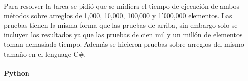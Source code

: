 \documentclass[11pt]{article}
\begin{document}
    \begin{center}
    \end{center}
    { \hspace*{\fill} \\}
    
    Para resolver la tarea se pidió que se midiera el tiempo de ejecución de
ambos métodos sobre arreglos de 1,000, 10,000, 100,000 y 1'000,000
elementos. Las pruebas tienen la misma forma que las pruebas de arriba,
sin embargo solo se incluyen los resultados ya que las pruebas de cien
mil y un millón de elementos toman demasiado tiempo. Además se hicieron
pruebas sobre arreglos del mismo tamaño en el lenguage C\#.

\paragraph{Python}\label{python}
\end{document}
